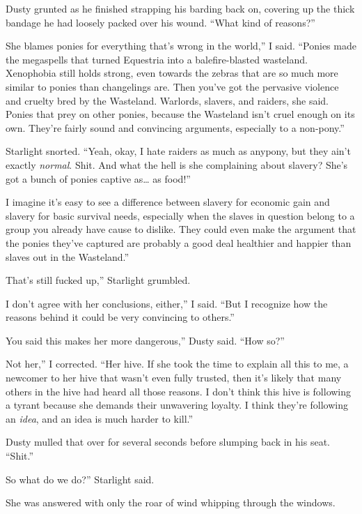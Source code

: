 Dusty grunted as he finished strapping his barding back on, covering up the thick bandage he had loosely packed over his wound. “What kind of reasons?”

\leavevmode{}She blames ponies for everything that’s wrong in the world,” I said. “Ponies made the megaspells that turned Equestria into a balefire-blasted wasteland. Xenophobia still holds strong, even towards the zebras that are so much more similar to ponies than changelings are. Then you’ve got the pervasive violence and cruelty bred by the Wasteland. Warlords, slavers, and raiders, she said. Ponies that prey on other ponies, because the Wasteland isn’t cruel enough on its own. They’re fairly sound and convincing arguments, especially to a non-pony.”

Starlight snorted. “Yeah, okay, I hate raiders as much as anypony, but they ain’t exactly \textit{normal}. Shit. And what the hell is she complaining about slavery? She’s got a bunch of ponies captive as… as food!”

\leavevmode{}I imagine it’s easy to see a difference between slavery for economic gain and slavery for basic survival needs, especially when the slaves in question belong to a group you already have cause to dislike. They could even make the argument that the ponies they’ve captured are probably a good deal healthier and happier than slaves out in the Wasteland.”

\leavevmode{}That’s still fucked up,” Starlight grumbled.

\leavevmode{}I don’t agree with her conclusions, either,” I said. “But I recognize how the reasons behind it could be very convincing to others.”

\leavevmode{}You said this makes her more dangerous,” Dusty said. “How so?”

\leavevmode{}Not her,” I corrected. “Her hive. If she took the time to explain all this to me, a newcomer to her hive that wasn’t even fully trusted, then it’s likely that many others in the hive had heard all those reasons. I don’t think this hive is following a tyrant because she demands their unwavering loyalty. I think they’re following an \textit{idea}, and an idea is much harder to kill.”

Dusty mulled that over for several seconds before slumping back in his seat. “Shit.”

\leavevmode{}So what do we do?” Starlight said.

She was answered with only the roar of wind whipping through the windows.

